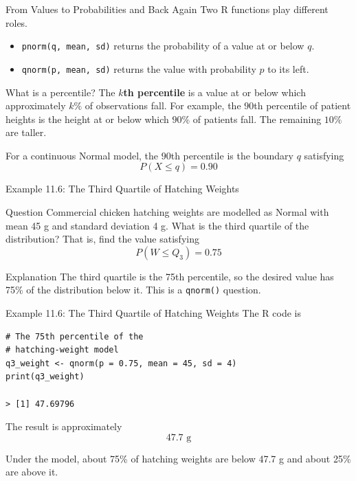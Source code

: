 \documentclass[aspectratio=169]{beamer}
\begin{document}
\begin{frame}{From Values to Probabilities and Back Again}
Two R functions play different roles.
\begin{itemize}
	\item \texttt{pnorm(q, mean, sd)} returns the probability of a value at or below $q$.
 	 \item \texttt{qnorm(p, mean, sd)} returns the value with probability $p$ to its left.
\end{itemize}

\begin{block}{What is a percentile?}
The \textbf{$k$th percentile} is a value at or below which approximately $k\%$ of observations fall. For example, the $90$th percentile of patient heights is the height at or below which $90\%$ of patients fall. The remaining $10\%$ are taller.
\end{block}

For a continuous Normal model, the $90$th percentile is the boundary $q$ satisfying
$$P(X\le q)=0.90$$
\end{frame}

\begin{frame}{Example 11.6: The Third Quartile of Hatching Weights}
\begin{block}{Question}
Commercial chicken hatching weights are modelled as Normal with mean 45 g and standard deviation 4 g. What is the third quartile of the distribution? That is, find the value satisfying
$$P(W\le Q_3)=0.75$$
\end{block}

\begin{block}{Explanation}
The third quartile is the 75th percentile, so the desired value has 75\% of the distribution below it. This is a \texttt{qnorm()} question. 
\end{block}
\end{frame}

\begin{frame}[fragile]{Example 11.6: The Third Quartile of Hatching Weights}
The R code is
\begin{verbatim}
# The 75th percentile of the
# hatching-weight model
q3_weight <- qnorm(p = 0.75, mean = 45, sd = 4)
print(q3_weight)

> [1] 47.69796
\end{verbatim}
The result is approximately
$$47.7\text{ g}$$

Under the model, about 75\% of hatching weights are below 47.7 g and about 25\% are above it.
\end{frame}
\end{document}
